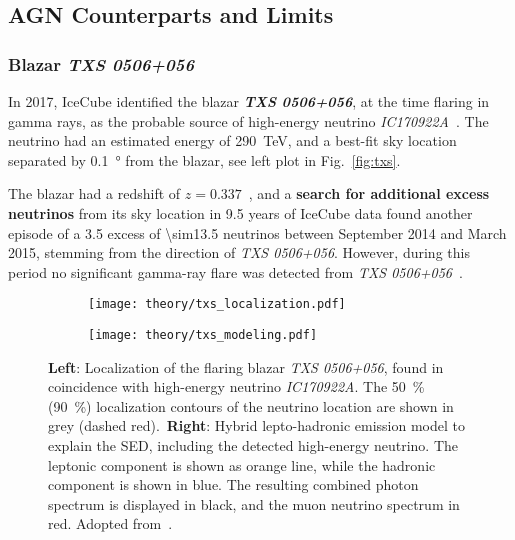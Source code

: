 \subsection{AGN Counterparts and Limits}

\subsubsection{Blazar \emph{TXS 0506+056}}
In 2017, IceCube identified the blazar \textbf{\emph{TXS 0506+056}}, at the time flaring in gamma rays, as the probable source of high-energy neutrino \emph{IC170922A}~. The neutrino had an estimated energy of \SI{290}{\tera\eV}, and a best-fit sky location separated by \SI{0.1}{\degree} from the blazar, see left plot in Fig.~\ref{fig:txs}.

The blazar had a redshift of $z=0.337$~, and a \textbf{search for additional excess neutrinos} from its sky location in 9.5 years of IceCube data found another episode of a \SI{3.5}{\sigma} excess of \num{\sim13.5} neutrinos between September 2014 and March 2015, stemming from the direction of \emph{TXS 0506+056}. However, during this period no significant gamma-ray flare was detected from \emph{TXS 0506+056}~.

\begin{figure}[htb]
    \centering
    \begin{subfigure}[b]{0.47\textwidth}
        \centering
        \texttt{[image: theory/txs\_localization.pdf]}
    \end{subfigure}
    \begin{subfigure}[b]{0.52\textwidth}
        \centering
        \texttt{[image: theory/txs\_modeling.pdf]}
    \end{subfigure}
    \caption[TXS 0506+056: Localization and SED]{\textbf{Left}: Localization of the flaring blazar \emph{TXS 0506+056}, found in coincidence with high-energy neutrino \emph{IC170922A}. The \SI{50}{\percent} (\SI{90}{\percent}) localization contours of the neutrino location are shown in grey (dashed red).\ \textbf{Right}: Hybrid lepto-hadronic emission model to explain the SED, including the detected high-energy neutrino. The leptonic component is shown as orange line, while the hadronic component is shown in blue. The resulting combined photon spectrum is displayed in black, and the muon neutrino spectrum in red. Adopted from~\cite{Aartsen2018, Gao2018}.}
\end{figure}

